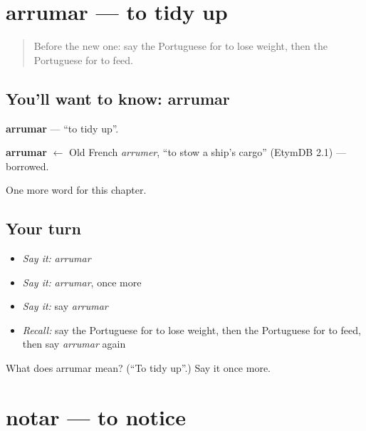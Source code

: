 \section[arrumar]{arrumar — to tidy up}

\label{lesson:PT-C239-arrumar}



\begin{quote}
Before the new one: say the Portuguese for to lose weight, then the Portuguese for to feed.
\end{quote}

\subsection*{You'll want to know: arrumar}
\textbf{arrumar} — \textquotedblleft{}to tidy up\textquotedblright{}.

\begin{cousinweb}
\textbf{arrumar} $\leftarrow$ Old French \emph{arrumer}, \textquotedblleft{}to stow a ship's cargo\textquotedblright{} (EtymDB 2.1) — borrowed.
\end{cousinweb}

\begin{grammarlens}[title={What you've built}]
One more word for this chapter.
\end{grammarlens}

\subsection*{Your turn}
\begin{itemize}
\raggedright
  \item \emph{Say it:} \emph{arrumar}
  \item \emph{Say it:} \emph{arrumar}, once more
  \item \emph{Say it:} say \emph{arrumar}
  \item \emph{Recall:} say the Portuguese for to lose weight, then the Portuguese for to feed, then say \emph{arrumar} again
\end{itemize}

\begin{tcolorbox}[breakable,colback=teal!4,colframe=teal!35!black,title={Before you move on}]
What does arrumar mean? (\textquotedblleft{}To tidy up\textquotedblright{}.) Say it once more.
\end{tcolorbox}
\section[notar]{notar — to notice}

